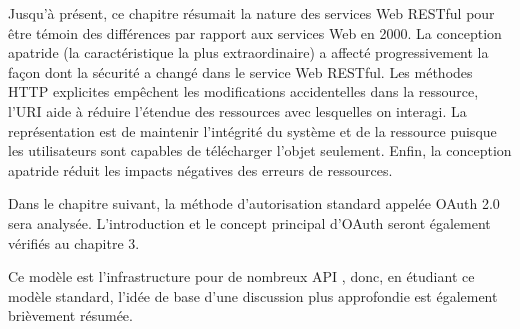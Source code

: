 Jusqu'à présent, ce chapitre résumait la nature des services Web RESTful pour être témoin des différences par rapport aux services Web en 2000. La conception apatride (la caractéristique la plus extraordinaire) a affecté progressivement la façon dont la sécurité a changé dans le service Web RESTful. Les méthodes HTTP explicites empêchent les modifications accidentelles dans la ressource, l'URI aide à réduire l'étendue des ressources avec lesquelles on interagi. La représentation est de maintenir l'intégrité du système et de la ressource puisque les utilisateurs sont capables de télécharger l'objet seulement. Enfin, la conception apatride réduit les impacts négatives des erreurs de ressources.

Dans le chapitre suivant, la méthode d'autorisation standard appelée OAuth 2.0 sera analysée. L'introduction et le concept principal d'OAuth seront également vérifiés au chapitre 3.

Ce modèle est l'infrastructure pour de nombreux API , donc, en étudiant ce modèle standard, l'idée de base d'une discussion plus approfondie est également brièvement résumée.




























